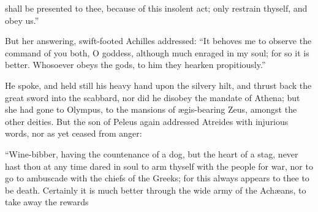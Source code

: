 \documentclass{ransom}
\begin{document}
shall be presented to thee, because of this insolent act; only
restrain thyself, and obey us.”

But her answering, swift-footed Achilles addressed: “It behoves me
to observe the command of you both, O goddess, although much enraged in
my soul; for so it is better. Whosoever obeys the gods, to him they
hearken propitiously.”


He spoke, and held still his heavy hand upon the silvery hilt, and
thrust back the great sword into the scabbard, nor did he disobey the
mandate of Athena; but she had gone to Olympus, to the mansions of
ægis-bearing Zeus, amongst the other deities. But the son of Peleus
again addressed Atreides with injurious words, nor as yet ceased from
anger:

“Wine-bibber, having the countenance of a dog, but the heart of a stag,
never hast thou at any time dared in soul to arm thyself with the
people for war, nor to go to ambuscade with the chiefs of the Greeks;
for this always appears to thee to be death. Certainly it is much
better through the wide army of the Achæans, to take away the rewards
\end{document}
